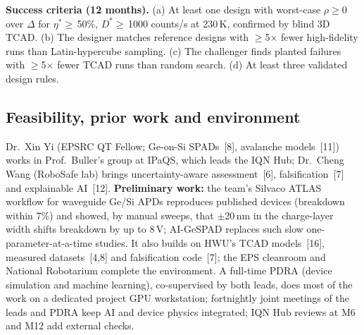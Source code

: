 \documentclass[11pt,a4paper]{article}
\newcommand{\cn}[1]{\textcolor{citeblue}{[#1]}}
\newcommand{\Xin}{Dr.~Xin Yi}           %
\newcommand{\Cheng}{Dr.~Cheng Wang}     %
\begin{document}
\textbf{Success criteria (12 months).} (a) At least one design with worst-case $\rho\ge0$ over $\Delta$ for $\eta^*\geq$\,50\%, $D^*\geq$\,1000 counts/s at 230\,K, confirmed by blind 3D TCAD. (b) The designer matches reference designs with $\geq$5$\times$ fewer high-fidelity runs than Latin-hypercube sampling. (c) The challenger finds planted failures with $\geq$5$\times$ fewer TCAD runs than random search. (d) At least three validated design rules.

\subsection{Feasibility, prior work and environment}
\Xin{} (EPSRC QT Fellow; Ge-on-Si SPADs~\cn{8}, avalanche models~\cn{11}) works in Prof.\ Buller's group at IPaQS, which leads the IQN Hub; \Cheng{} (RoboSafe lab) brings uncertainty-aware assessment~\cn{6}, falsification~\cn{7} and explainable AI~\cn{12}. \textbf{Preliminary work:} the team's Silvaco ATLAS workflow for waveguide Ge/Si APDs reproduces published devices (breakdown within 7\%) and showed, by manual sweeps, that $\pm$20\,nm in the charge-layer width shifts breakdown by up to 8\,V; AI-GeSPAD replaces such slow one-parameter-at-a-time studies. It also builds on HWU's TCAD models~\cn{16}, measured datasets~\cn{4,8} and falsification code~\cn{7}; the EPS cleanroom and National Robotarium complete the environment. A full-time PDRA (device simulation and machine learning), co-supervised by both leads, does most of the work on a dedicated project GPU workstation; fortnightly joint meetings of the leads and PDRA keep AI and device physics integrated; IQN Hub reviews at M6 and M12 add external checks.
\end{document}
